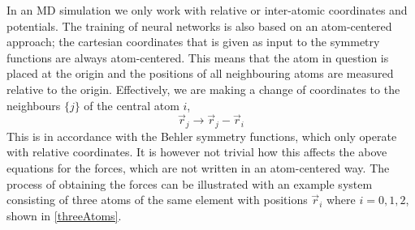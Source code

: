 \documentclass[twoside,english]{uiofysmaster}
\begin{document}
In an MD simulation we only work with relative or inter-atomic coordinates and potentials. 
The training of neural networks is also based on an atom-centered approach; the cartesian coordinates
that is given as input to the symmetry functions are always atom-centered. This means that the atom
in question is placed at the origin and the positions of all neighbouring atoms are measured relative to 
the origin. Effectively, we are making a change of coordinates to the neighbours $\{j\}$ of the central atom $i$,
\begin{equation}
 \vec{r}_j \rightarrow \vec{r}_j - \vec{r}_i
 \label{changeOfCoordinates}
\end{equation}
This is in accordance with the Behler symmetry functions, which only operate with relative coordinates. 
It is however not trivial how this affects the above equations for the forces, which are not written in 
an atom-centered way. The process of obtaining the forces can be illustrated with an example system
consisting of three atoms of the same element with positions $\vec{r}_i$ where $i = 0,1,2$, shown in \autoref{threeAtoms}.

\end{document}
